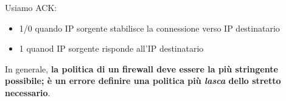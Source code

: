 \noindent Usiamo ACK:
\begin{itemize}
    \item 1/0 quando IP sorgente stabilisce la connessione verso IP destinatario 
    \item 1 quanod IP sorgente risponde all'IP destinatario
\end{itemize}


\noindent In generale, \textbf{la politica di un firewall deve essere la più stringente 
possibile; è un errore definire una politica più \textit{lasca} dello stretto necessario}.


